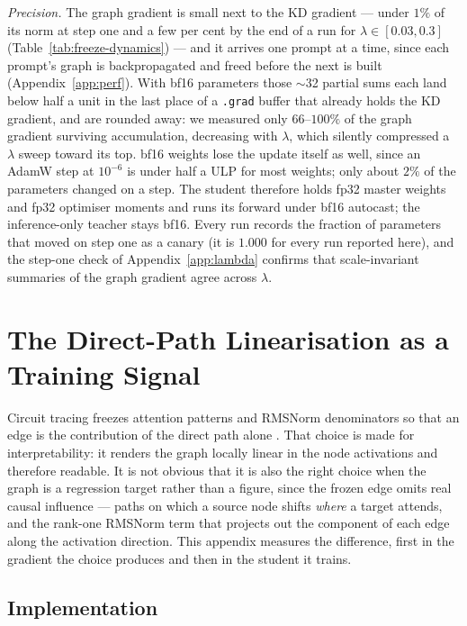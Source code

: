 \documentclass{article}
\begin{document}
\emph{Precision.} The graph gradient is small next to the KD gradient --- under $1\%$ of its norm
at step one and a few per cent by the end of a run for $\lambda \in [0.03, 0.3]$
(Table~\ref{tab:freeze-dynamics}) --- and it arrives one prompt at a time, since each prompt's
graph is backpropagated and freed before the next is built (Appendix~\ref{app:perf}). With bf16
parameters those $\sim$32 partial sums each land below half a unit in the last place of a
\texttt{.grad} buffer that already holds the KD gradient, and are rounded away: we measured only
$66$--$100\%$ of the graph gradient surviving accumulation, decreasing with $\lambda$, which
silently compressed a $\lambda$ sweep toward its top. bf16 weights lose the update itself as well,
since an AdamW step at $10^{-6}$ is under half a ULP for most weights; only about $2\%$ of the
parameters changed on a step. The student therefore holds fp32 master weights and fp32 optimiser
moments and runs its forward under bf16 autocast; the inference-only teacher stays bf16. Every run
records the fraction of parameters that moved on step one as a canary (it is $1.000$ for every run
reported here), and the step-one check of Appendix~\ref{app:lambda} confirms that scale-invariant
summaries of the graph gradient agree across $\lambda$.


\section{The Direct-Path Linearisation as a Training Signal}
\label{app:freeze}

Circuit tracing freezes attention patterns and RMSNorm denominators so that an edge is the
contribution of the direct path alone \citep{ameisen2025circuit}. That choice is made for
interpretability: it renders the graph locally linear in the node activations and therefore
readable. It is not obvious that it is also the right choice when the graph is a regression target
rather than a figure, since the frozen edge omits real causal influence --- paths on which a source
node shifts \emph{where} a target attends, and the rank-one RMSNorm term that projects out the
component of each edge along the activation direction. This appendix measures the difference,
first in the gradient the choice produces and then in the student it trains.

\subsection{Implementation}
\end{document}

